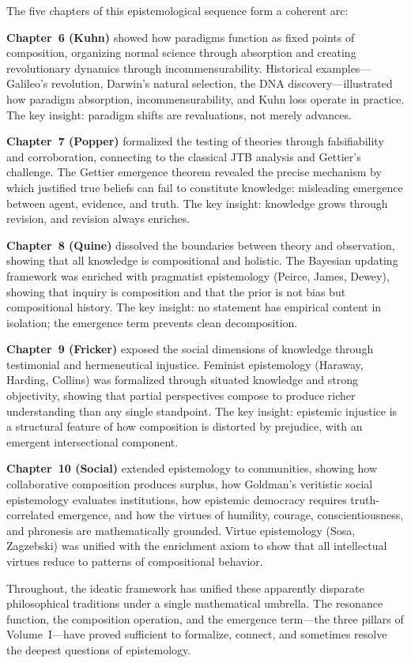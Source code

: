 \begin{remark}
The five chapters of this epistemological sequence form a coherent arc:

\textbf{Chapter~6 (Kuhn)} showed how paradigms function as fixed points of
composition, organizing normal science through absorption and creating
revolutionary dynamics through incommensurability. Historical examples---Galileo's
revolution, Darwin's natural selection, the DNA discovery---illustrated how
paradigm absorption, incommensurability, and Kuhn loss operate in practice.
The key insight: paradigm shifts are revaluations, not merely advances.

\textbf{Chapter~7 (Popper)} formalized the testing of theories through
falsifiability and corroboration, connecting to the classical JTB analysis
and Gettier's challenge. The Gettier emergence theorem revealed the precise
mechanism by which justified true beliefs can fail to constitute knowledge:
misleading emergence between agent, evidence, and truth. The key insight:
knowledge grows through revision, and revision always enriches.

\textbf{Chapter~8 (Quine)} dissolved the boundaries between theory and
observation, showing that all knowledge is compositional and holistic.
The Bayesian updating framework was enriched with pragmatist epistemology
(Peirce, James, Dewey), showing that inquiry is composition and that the prior
is not bias but compositional history. The key insight: no statement has
empirical content in isolation; the emergence term prevents clean decomposition.

\textbf{Chapter~9 (Fricker)} exposed the social dimensions of knowledge through
testimonial and hermeneutical injustice. Feminist epistemology (Haraway, Harding,
Collins) was formalized through situated knowledge and strong objectivity,
showing that partial perspectives compose to produce richer understanding
than any single standpoint. The key insight: epistemic injustice is a structural
feature of how composition is distorted by prejudice, with an emergent
intersectional component.

\textbf{Chapter~10 (Social)} extended epistemology to communities, showing how
collaborative composition produces surplus, how Goldman's veritistic social
epistemology evaluates institutions, how epistemic democracy requires
truth-correlated emergence, and how the virtues of humility, courage,
conscientiousness, and phronesis are mathematically grounded. Virtue epistemology
(Sosa, Zagzebski) was unified with the enrichment axiom to show that all
intellectual virtues reduce to patterns of compositional behavior.

Throughout, the ideatic framework has unified these apparently disparate
philosophical traditions under a single mathematical umbrella. The resonance
function, the composition operation, and the emergence term---the three
pillars of Volume~I---have proved sufficient to formalize, connect, and
sometimes resolve the deepest questions of epistemology.
\end{remark}

